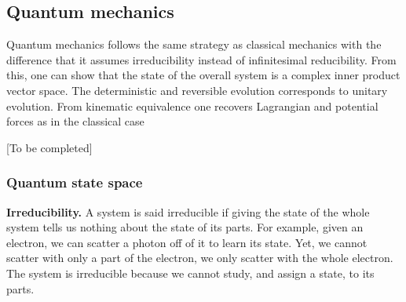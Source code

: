 \documentclass[twocolumn]{article}
\newif\ifextended
\newcommand\fact[2]{\ifextended \emph{#1}.#2 \fi}
\begin{document}
\subsection{Quantum mechanics}

Quantum mechanics follows the same strategy as classical mechanics with the difference that it assumes irreducibility instead of infinitesimal reducibility. From this, one can show that the state of the overall system is a complex inner product vector space. The deterministic and reversible evolution corresponds to unitary evolution. From kinematic equivalence one recovers Lagrangian and potential forces as in the classical case

[To be completed]

\subsubsection{Quantum state space}

\textbf{Irreducibility.} A system is said irreducible if giving the state of the whole system tells us nothing about the state of its parts. For example, given an electron, we can scatter a photon off of it to learn its state. Yet, we cannot scatter with only a part of the electron, we only scatter with the whole electron. The system is irreducible because we cannot study, and assign a state, to its parts.

\fact{Divisibility vs reducibility vs decomposability} {There are three concepts that are often confused to one another. Divisibility is the possibility to divide a system into two independent ones. That is, we have a time evolution such that we start from a state of a system and we end up with two states of independent systems. Reducibility is the ability to describe a system as the composition of more systems. That is, giving the state of the system at one time is the same as giving the state of the parts at the same time. These are independent properties.\footnote{For example, the Planarian worm is divisible into two worms but is not reducible to two worms. A muon is divisible (i.e. it decays) into an electron and two neutrinos but is not reducible to them. A magnetic is reducible to a north and a south pole but is not divisible into them. A proton is reducible to quarks and gluons but is not divisible into them.} Decomposability is the ability to treat one object as the composition of others. We take two objects or descriptions and combine them formally to give a new one. This is again independent from the rest and often is just mathematical convenience.\footnote{For example, velocity in any direction can be decomposed into the components along the axis, but is not divisible or reducible to those components. A pure state is decomposable into a linear combination of a basis but is not reducible or divisible into the basis.}}
\end{document}
